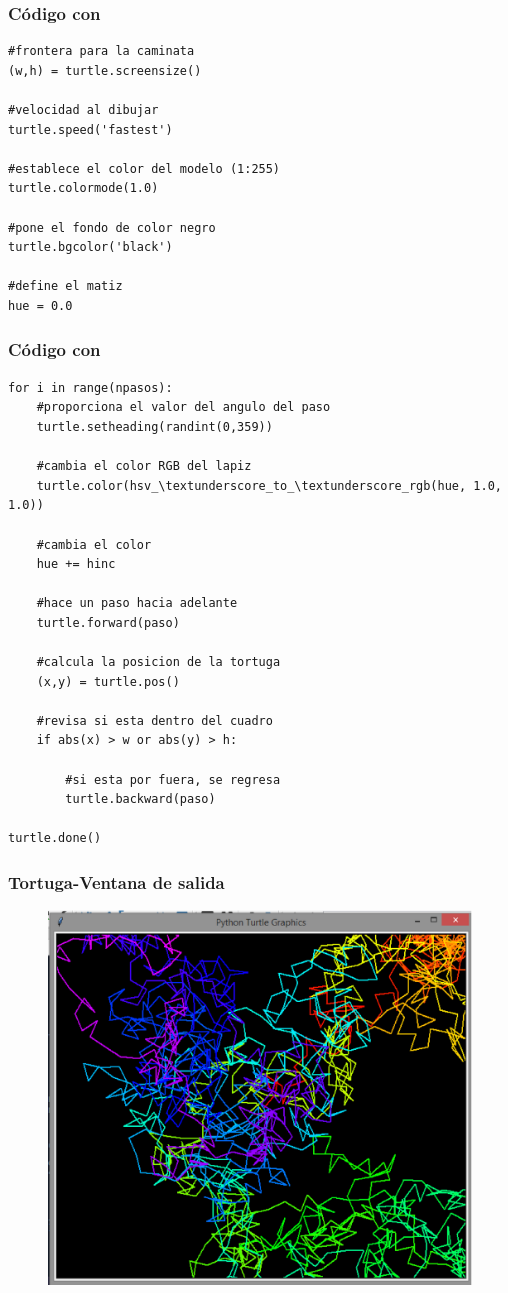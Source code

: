 \begin{frame}
\frametitle{Código con \python}
\begin{lstlisting}[caption=Aspecto gráfico del entorno, style=FormattedNumber, basicstyle=\linespread{1.1}\ttfamily=\small, columns=fullflexible]
#frontera para la caminata
(w,h) = turtle.screensize()

#velocidad al dibujar
turtle.speed('fastest')

#establece el color del modelo (1:255)
turtle.colormode(1.0)

#pone el fondo de color negro
turtle.bgcolor('black')

#define el matiz
hue = 0.0
\end{lstlisting}
\end{frame}
\begin{frame}
\frametitle{Código con \python}
\begin{lstlisting}[caption=Definición de pasos y dirección, style=FormattedNumber, basicstyle=\linespread{1.1}\ttfamily=\small, columns=fullflexible]
for i in range(npasos):
	#proporciona el valor del angulo del paso
    turtle.setheading(randint(0,359))
    
    #cambia el color RGB del lapiz
    turtle.color(hsv_\textunderscore_to_\textunderscore_rgb(hue, 1.0, 1.0))
    
    #cambia el color
    hue += hinc
    
    #hace un paso hacia adelante
    turtle.forward(paso)
    
    #calcula la posicion de la tortuga
    (x,y) = turtle.pos()
    
    #revisa si esta dentro del cuadro
    if abs(x) > w or abs(y) > h:
    	
    	#si esta por fuera, se regresa
        turtle.backward(paso)
        
turtle.done()
\end{lstlisting}
\end{frame}
\begin{frame}
\frametitle{Tortuga-Ventana de salida}
\begin{figure}
	\centering
	\includegraphics[scale=0.3]{Imagenes/caminataAleatoria_Python_01.eps}
\end{figure}
\end{frame}
